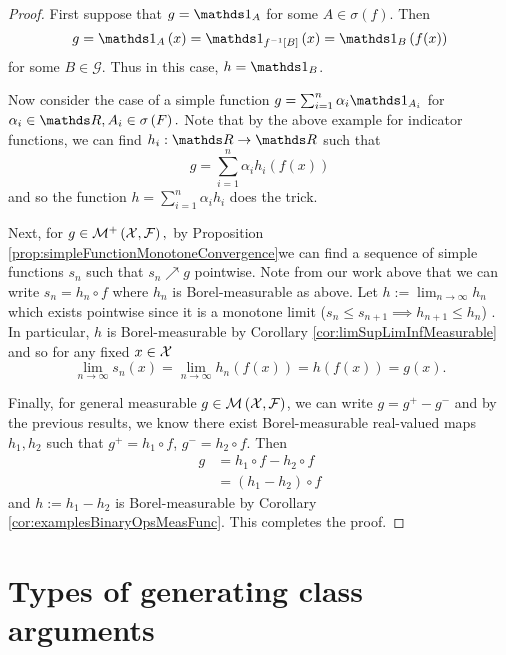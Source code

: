 \begin{proof}
First suppose that $g=\indicate_{A}$ for some $A\in\sigma\left(f\right).$
Then
\[
g=\indicate_{A}\left(x\right)=\indicate_{f^{-1}\left[B\right]}\left(x\right)=\indicate_{B}\left(f(x)\right)
\]
for some $B\in\mathcal{G}.$ Thus in this case, $h=\indicate_{B}$.

Now consider the case of a simple function $g=\sum_{i=1}^{n}\alpha_{i}\indicate_{A_{i}}$
for $\alpha_{i}\in\R,A_{i}\in\sigma\left(F\right).$ Note that by
the above example for indicator functions, we can find $h_{i}:\R\to\R$
such that 
\[
g=\sum_{i=1}^{n}\alpha_{i}h_{i}\left(f(x)\right)
\]
and so the function $h=\sum_{i=1}^{n}\alpha_{i}h_{i}$ does the trick.

Next, for $g\in\mathcal{M}^{+}\left(\mathcal{X},\mathcal{F}\right),$ by Proposition \ref{prop:simpleFunctionMonotoneConvergence}we
can find a sequence of simple functions $s_{n}$ such that $s_{n}\nearrow g$
pointwise. Note from our work above that we can write $s_{n}=h_{n}\circ f$
where $h_{n}$ is Borel-measurable as above. Let $h:=\lim_{n\to\infty}h_{n}$
which exists pointwise since it is a monotone limit ($s_{n}\leq s_{n+1}\implies h_{n+1}\leq h_{n}$)
. In particular, $h$ is Borel-measurable by Corollary \ref{cor:limSupLimInfMeasurable}
and so for any fixed $x\in\mathcal{X}$
\[
\lim_{n\to\infty}s_{n}\left(x\right)=\lim_{n\to\infty}h_{n}\left(f\left(x\right)\right)=h\left(f\left(x\right)\right)=g\left(x\right).
\]

Finally, for general measurable $g\in\mathcal{M}\left(\mathcal{X},\mathcal{F}\right)$, we can
write $g=g^{+}-g^{-}$ and by the previous results, we know there
exist Borel-measurable real-valued maps $h_{1},h_{2}$ such that $g^{+}=h_{1}\circ f$,
$g^{-}=h_{2}\circ f.$ Then
\begin{align*}
g & =h_{1}\circ f-h_{2}\circ f\\
 & =(h_{1}-h_{2})\circ f
\end{align*}
and $h:=h_{1}-h_{2}$ is Borel-measurable by Corollary \ref{cor:examplesBinaryOpsMeasFunc}.
This completes the proof.
\end{proof}

\section{Types of generating class arguments}

